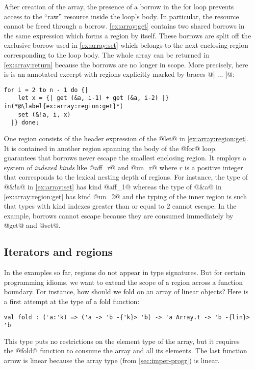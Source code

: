 After
creation of the array, the presence of a borrow in the for loop
prevents access to the ``raw'' resource inside the loop's
body. In particular, the resource cannot be freed through a
borrow. \cref{ex:array:get} contains two shared borrows 
in the same expression which forms a region by itself. These borrows
are split off the exclusive borrow used in \cref{ex:array:set} which
belongs to the next enclosing region corresponding to the loop body.
The whole array can be returned in \cref{ex:array:return} because  the
borrows are no longer in scope.
%
More precisely, here is is an annotated excerpt with regions explicitly
marked by braces @{| ... |}@:
\begin{lstlisting}[firstnumber=3]
  for i = 2 to n - 1 do {|
    let x = {| get (&a, i-1) + get (&a, i-2) |} in(*@\label{ex:array:region:get}*)
    set (&!a, i, x)
  |} done;
\end{lstlisting}

One region consists of the header expression of the @let@ in
\cref{ex:array:region:get}. It is contained in another region
spanning the body of the @for@ loop. \lang guarantees that borrows
never escape the smallest enclosing region. It employs a system of
\emph{indexed kinds} like @aff_r@ and @un_r@ where
$r$ is a positive integer that corresponds to the lexical nesting
depth of regions. For instance, the type of @&!a@ in
\cref{ex:array:set} has kind @aff_1@ whereas the type of
@&a@ in \cref{ex:array:region:get} has kind
@un_2@ and the typing of the inner region is such that types with
kind indexes greater than or equal to $2$ cannot escape.
In the example, borrows cannot escape  because they are consumed
immediately by @get@ and @set@.



\subsection{Iterators and regions}
\label{tuto:vector}

In the examples so far, regions do not appear in type signatures.
But for certain programming idioms, we want to extend the scope of a
region across a function boundary.
For instance, how should we fold on an array of linear objects?
Here is a first attempt at the type of a fold function:
\begin{lstlisting}[numbers=none]
val fold : ('a:'k) => ('a -> 'b -{'k}> 'b) -> 'a Array.t -> 'b -{lin}> 'b
\end{lstlisting}
This type puts no restrictions on the element type of the array, but
it requires the @fold@ function to consume the array and all its
elements. The last function arrow is linear because the array type (from
\cref{sec:imper-progr}) is linear. 

